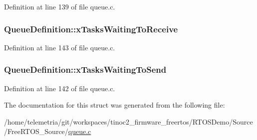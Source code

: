 Definition at line 139 of file queue.\+c.

\subsubsection[{\texorpdfstring{x\+Tasks\+Waiting\+To\+Receive}{xTasksWaitingToReceive}}]{ Queue\+Definition\+::x\+Tasks\+Waiting\+To\+Receive}\hypertarget{struct_queue_definition_af6d61526f77beee659cd604a0c473359}{}\label{struct_queue_definition_af6d61526f77beee659cd604a0c473359}


Definition at line 143 of file queue.\+c.

\subsubsection[{\texorpdfstring{x\+Tasks\+Waiting\+To\+Send}{xTasksWaitingToSend}}]{ Queue\+Definition\+::x\+Tasks\+Waiting\+To\+Send}\hypertarget{struct_queue_definition_aaab135c4345cb0393d6ff3cd5164c7b2}{}\label{struct_queue_definition_aaab135c4345cb0393d6ff3cd5164c7b2}


Definition at line 142 of file queue.\+c.



The documentation for this struct was generated from the following file\+:\begin{DoxyCompactItemize}
\item 
/home/telemetria/git/workspaces/tinoc2\+\_\+firmware\+\_\+freertos/\+R\+T\+O\+S\+Demo/\+Source/\+Free\+R\+T\+O\+S\+\_\+\+Source/\hyperlink{queue_8c}{queue.\+c}\end{DoxyCompactItemize}
